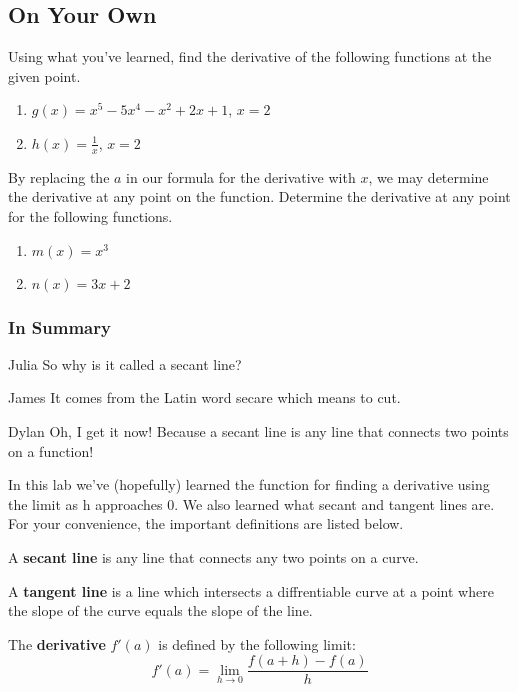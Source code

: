 \documentclass{ximera}
\begin{document}
\subsection{On Your Own}
Using what you've learned, find the derivative of the following functions at the given point.
\begin{enumerate}
\item{$g(x) = x^5-5x^4-x^2+2x+1$, $x=2$}
\item{$h(x) = \frac{1}{x}$, $x=2$}
\end{enumerate}
By replacing the $a$ in our formula for the derivative with $x$, we may determine the derivative at any point on the function. Determine the derivative at any point for the following functions.
\begin{enumerate}
\item{$m(x) = x^3$}
\item{$n(x) = 3x+2$}
\end{enumerate}


\subsubsection{In Summary}
\begin{dialogue}
\item[Julia] So why is it called a secant line?
\item[James] It comes from the Latin word secare which means to cut.
\item[Dylan] Oh, I get it now! Because a secant line is any line that connects two points on a function!
\end{dialogue}
In this lab we've (hopefully) learned the function for finding a derivative using the limit as h approaches 0. We also learned what secant and tangent lines are. For your convenience, the important definitions are listed below. 
\begin{definition}
 A \textbf{secant line} is any line that connects any two points on a curve.
\end{definition}
\begin{definition}
A \textbf{tangent line} is a line which intersects a diffrentiable curve at a point where the slope of the curve equals the slope of the line.
\end{definition}
\begin{definition}
The \textbf{derivative} $f'(a)$ is defined by the following limit:
$$f'(a)=\displaystyle \lim_{h\rightarrow 0} \frac{f(a+h)-f(a)}{h}$$
\end{definition}
\pagebreak
\end{document}
